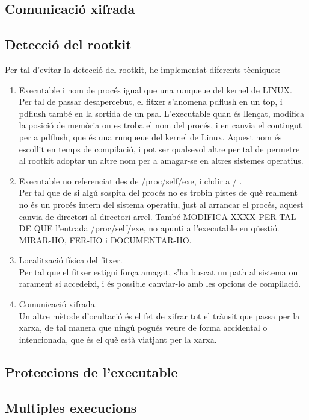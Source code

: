 \subsection{Comunicació xifrada}
\subsection{Detecció del rootkit}
Per tal d'evitar la detecció del rootkit, he implementat diferents tècniques:
\begin{enumerate}
\item Executable i nom de procés igual que una runqueue del kernel de LINUX. \\
Per tal de passar desapercebut, el fitxer s'anomena pdflush en un top, i
pdflush també en la sortida de un psa. L'executable quan és llençat, modifica la posició de memòria on es troba el nom del procés, i en canvia el contingut
per a pdflush, que és una runqueue del kernel de Linux. Aquest nom és escollit en temps de compilació, i pot ser qualsevol altre per tal de permetre al
rootkit adoptar un altre nom per a amagar-se en altres sistemes operatius.
\item Executable no referenciat des de /proc/self/exe, i chdir a / . \\
Per tal que de si algú sospita del procés no es trobin pistes de què realment no és un procés intern del sistema operatiu, just al arrancar el procés,
aquest canvia de directori al directori arrel. També MODIFICA XXXX PER TAL DE QUE l'entrada /proc/self/exe, no apunti a l'executable en qüestió. MIRAR-HO, 
FER-HO i DOCUMENTAR-HO.
\item Localització física del fitxer. \\
Per tal que el fitxer estigui força amagat, s'ha  buscat un path al sistema on rarament si accedeixi, i és possible canviar-lo amb les opcions de compilació.
\item Comunicació xifrada. \\
Un altre mètode d'ocultació és el fet de xifrar tot el trànsit que passa per la xarxa, de tal manera que ningú pogués veure de forma accidental o 
intencionada, que és el què està viatjant per la xarxa.
\end{enumerate} 

\subsection{Proteccions de l'executable}
\subsection{Multiples execucions}
